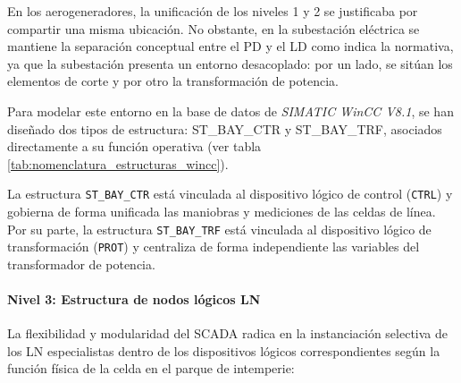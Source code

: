 En los aerogeneradores, la unificación de los niveles 1 y 2 se justificaba por compartir una misma ubicación. No obstante, en la subestación eléctrica se mantiene la separación conceptual entre el \ac{PD} y el \ac{LD} como indica la normativa, ya que la subestación presenta un entorno desacoplado: por un lado, se sitúan los elementos de corte y por otro la transformación de potencia.\par

Para modelar este entorno en la base de datos de \textit{SIMATIC WinCC V8.1}, se han diseñado dos tipos de estructura: ST\_BAY\_CTR y ST\_BAY\_TRF, asociados directamente a su función operativa (ver tabla \ref{tab:nomenclatura_estructuras_wincc}). \par
La estructura \texttt{ST\_BAY\_CTR} está vinculada al dispositivo lógico de control (\texttt{CTRL}) y gobierna de forma unificada las maniobras y mediciones de las celdas de línea. Por su parte, la estructura \texttt{ST\_BAY\_TRF} está vinculada al dispositivo lógico de transformación (\texttt{PROT}) y centraliza de forma independiente las variables del transformador de potencia.
\begin{table}[t]
    \centering
    \caption{Nomenclatura oficial y asignación de los Tipos de Estructura (\textit{Structure Types}) en el SCADA para la subestación.}
    \label{tab:nomenclatura_estructuras_wincc}
\end{table}


\paragraph{Nivel 3: Estructura de nodos lógicos \ac{LN}}
\label{sec:sub_nivel3}

La flexibilidad y modularidad del \ac{SCADA} radica en la instanciación selectiva de los \ac{LN} especialistas dentro de los dispositivos lógicos correspondientes según la función física de la celda en el parque de intemperie:

